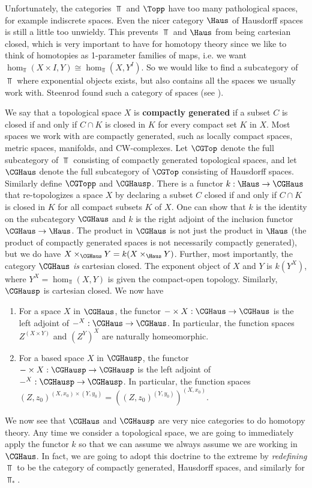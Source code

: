 Unfortunately, the categories $\Top$ and $\Topp$ have too many pathological spaces, for example indiscrete spaces. Even the nicer category $\Haus$ of Hausdorff spaces is still a little too unwieldy. This prevents $\Top$ and $\Haus$ from being cartesian closed, which is very important to have for homotopy theory since we like to think of homotopies as 1-parameter families of maps, i.e. we want $\hom_{\Top}(X \times I,Y) \cong \hom_{\Top}(X,Y^I)$. So we would like to find a subcategory of $\Top$ where exponential objects exists, but also contains all the spaces we usually work with. Steenrod found such a category of spaces (see \cite{steenrod67}). 

We say that a topological space $X$ is \textbf{compactly generated} if a subset $C$ is closed if and only if $C \cap K$ is closed in $K$ for every compact set $K$ in $X$. Most spaces we work with are compactly generated, such as locally compact spaces, metric spaces, manifolds, and CW-complexes. Let $\CGTop$ denote the full subcategory of $\Top$ consisting of compactly generated topological spaces, and let $\CGHaus$ denote the full subcategory of $\CGTop$ consisting of Hausdorff spaces. Similarly define $\CGTopp$ and $\CGHausp$. There is a functor $k : \Haus \rightarrow \CGHaus$ that re-topologizes a space $X$ by declaring a subset $C$ closed if and only if $C \cap K$ is closed in $K$ for all compact subsets $K$ of $X$. One can show that $k$ is the identity on the subcategory $\CGHaus$ and $k$ is the right adjoint of the inclusion functor $\CGHaus \rightarrow \Haus$. The product in $\CGHaus$ is not just the product in $\Haus$ (the product of compactly generated spaces is not necessarily compactly generated), but we do have $X \times_{\CGHaus} Y = k(X \times_\Haus Y)$. Further, most importantly, the category $\CGHaus$ \emph{is} cartesian closed. The exponent object of $X$ and $Y$ is $k(Y^X)$, where $Y^X = \hom_{\Top}(X,Y)$ is given the compact-open topology. Similarly, $\CGHausp$ is cartesian closed. We now have
\begin{prop}
\sloppyspace
\begin{enumerate}
	\item For a space $X$ in $\CGHaus$, the functor $-\times X : \CGHaus \rightarrow \CGHaus$ is the left adjoint of $-^X : \CGHaus \rightarrow \CGHaus$. In particular, the function spaces $Z^{(X \times Y)}$ and $(Z^Y)^X$ are naturally homeomorphic. 
	\item For a based space $X$ in $\CGHausp$, the functor $-\times X : \CGHausp \rightarrow \CGHausp$ is the left adjoint of $-^X : \CGHausp \rightarrow \CGHausp$. In particular, the function spaces $(Z,z_0)^{(X,x_0)\times(Y,y_0)} = ((Z,z_0)^{(Y,y_0)})^{(X,x_0)}$.
\end{enumerate}
\end{prop}
We now see that $\CGHaus$ and $\CGHausp$ are very nice categories to do homotopy theory. Any time we consider a topological space, we are going to immediately apply the functor $k$ so that we can assume we always assume we are working in $\CGHaus$. In fact, we are going to adopt this doctrine to the extreme by \emph{redefining} $\Top$ to be the category of compactly generated, Hausdorff spaces, and similarly for $\Top_*$. 

